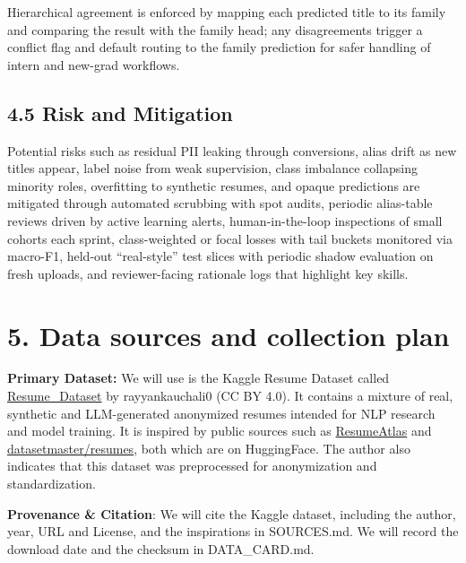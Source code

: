 \documentclass[12pt]{article}
\begin{document}
\medskip

Hierarchical agreement is enforced by mapping each predicted title to its family and comparing the result with the family head; any disagreements trigger a conflict flag and default routing to the family prediction for safer handling of intern and new-grad workflows.

\medskip

\subsection*{4.5 Risk and Mitigation}
Potential risks such as residual PII leaking through conversions, alias drift as new titles appear, label noise from weak supervision, class imbalance collapsing minority roles, overfitting to synthetic resumes, and opaque predictions are mitigated through automated scrubbing with spot audits, periodic alias-table reviews driven by active learning alerts, human-in-the-loop inspections of small cohorts each sprint, class-weighted or focal losses with tail buckets monitored via macro-F1, held-out ``real-style'' test slices with periodic shadow evaluation on fresh uploads, and reviewer-facing rationale logs that highlight key skills.

\setlength{\parindent}{15pt}

\section*{5. Data sources and collection plan}
\textbf{Primary Dataset:} We will use is the Kaggle Resume Dataset called \href{https://www.kaggle.com/datasets/rayyankauchali0/resume-dataset?resource=download}{Resume\_Dataset} by rayyankauchali0 (CC BY 4.0).
It contains a mixture of real, synthetic and LLM-generated anonymized resumes intended for NLP research and model training. It is inspired by public sources such as \href{https://huggingface.co/collections/ahmedheakl/resumeatlas-668047e86bc332049afd0b39}{ResumeAtlas} and
\href{https://huggingface.co/datasets/datasetmaster/resumes}{datasetmaster/resumes}, both which are on HuggingFace. The author also indicates that this dataset was preprocessed for anonymization and standardization.

\noindent \textbf{Provenance \& Citation}:  We will cite the Kaggle dataset, including the author, year, URL and License, and the inspirations in SOURCES.md. We will record the download date and the checksum in DATA\_CARD.md.
\end{document}
